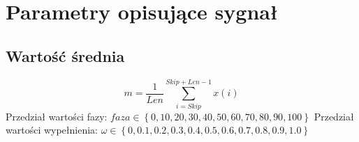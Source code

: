 \documentclass[wide,a4paper,titlepage,12pt]{mwart}
\begin{document}
  \lstset{ %
    language=Octave,                %
    basicstyle=\scriptsize,       %
    numbers=left,                   %
    numberstyle=\scriptsize,      %
    stepnumber=10,                   %
    numbersep=9pt,                  %
    showspaces=false,               %
    showstringspaces=false,         %
    showtabs=false,                 %
    breaklines=true,                %
    }
    
    
  
  \section{Parametry opisujące sygnał}
    \subsection{Wartość średnia}
      \begin{displaymath}
        m = \frac{1}{Len} \sum^{Skip+Len-1}_{i=Skip} x(i)
      \end{displaymath}
      Przedział wartości fazy: $faza \in \left \{0,10,20,30,40,50,60,70,80,90,100\right \}$
      \newline
      Przedział wartości wypełnienia: $\omega \in \left \{0, 0.1, 0.2, 0.3, 0.4, 0.5, 0.6, 0.7, 0.8, 0.9, 1.0\right \}$
      \newline
      
\end{document}

